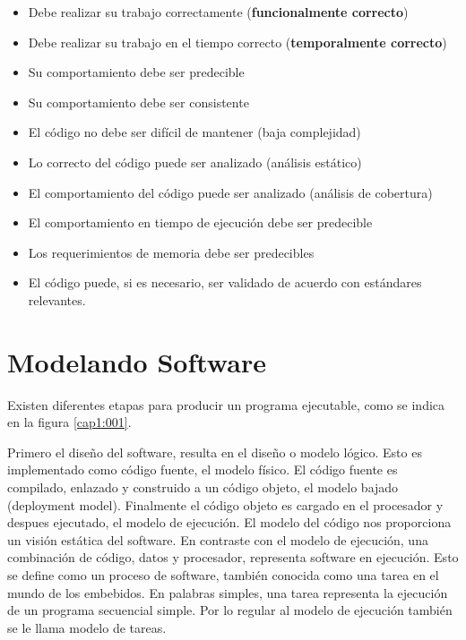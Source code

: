\documentclass[12pt, twoside]{report}
\begin{document}
\begin{itemize}
	\item Debe realizar su trabajo correctamente (\textbf{funcionalmente correcto})
	\item Debe realizar su trabajo en el tiempo correcto (\textbf{temporalmente correcto})
	\item Su comportamiento debe ser predecible
	\item Su comportamiento debe ser consistente
	\item El código no debe ser difícil de mantener (baja complejidad)
	\item Lo correcto del código puede ser analizado (análisis estático)
	\item El comportamiento del código puede ser analizado (análisis de cobertura) 
	\item El comportamiento en tiempo de ejecución debe ser predecible
	\item Los requerimientos de memoria debe ser predecibles
	\item El código puede, si es necesario, ser validado de acuerdo con estándares relevantes. 
	
\end{itemize} 

\section{Modelando Software}
Existen diferentes etapas para producir un programa ejecutable, como se indica en la figura \ref{cap1:001}.


Primero el diseño del software, resulta en el diseño o modelo lógico. Esto es implementado como código fuente, el modelo físico. El código fuente es compilado, enlazado y construido a un código objeto, el modelo bajado (deployment model). Finalmente el código objeto es cargado en el procesador y despues ejecutado, el modelo de ejecución. 
El modelo del código nos proporciona un visión estática del software. En contraste con el modelo de ejecución, una combinación de código, datos y procesador, representa software en ejecución. Esto se define como un proceso de software, también conocida como una tarea en el mundo de los embebidos. En palabras simples, una tarea representa la ejecución de un programa secuencial simple. Por lo regular al modelo de ejecución también se le llama modelo de tareas.
\end{document}
